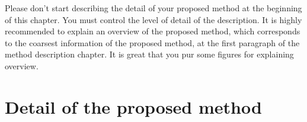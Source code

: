 ﻿Please don't start describing the detail of your proposed method at the beginning of this chapter.
You must control the level of detail of the description.
It is highly recommended to explain an overview of the proposed method, which corresponds to the coarsest information of the proposed method, at the first paragraph of the method description chapter.
It is great that you pur some figures for explaining overview.

\section{Detail of the proposed method}